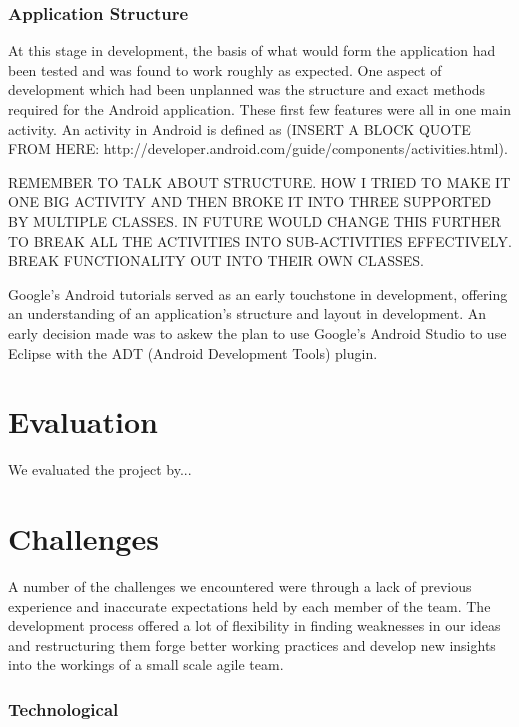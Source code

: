 \documentclass{l3proj}
\begin{document}
\subsection{Application Structure}
At this stage in development, the basis of what would form the application had been tested and was found to work roughly as expected. One aspect of development which had been unplanned was the structure and exact methods required for the Android application. These first few features were all in one main activity. An activity in Android is defined as (INSERT A BLOCK QUOTE FROM HERE:
http://developer.android.com/guide/components/activities.html).

REMEMBER TO TALK ABOUT STRUCTURE. HOW I TRIED TO MAKE IT ONE BIG ACTIVITY AND
THEN BROKE IT INTO THREE SUPPORTED BY MULTIPLE CLASSES. IN FUTURE WOULD CHANGE
THIS FURTHER TO BREAK ALL THE ACTIVITIES INTO SUB-ACTIVITIES EFFECTIVELY. BREAK
FUNCTIONALITY OUT INTO THEIR OWN CLASSES.

Google's Android tutorials served as an early touchstone in development,
offering an understanding of an application's structure and layout in
development. An early decision made was to askew the plan to use Google's
Android Studio to use Eclipse with the ADT (Android Development Tools) plugin.

\chapter{Evaluation}

We evaluated the project by...

\chapter{Challenges}
\label{Challenges}

A number of the challenges we encountered were through a lack of previous
experience and inaccurate expectations held by each member of the team. The
development process offered a lot of flexibility in finding weaknesses in our
ideas and restructuring them forge better working practices and develop new
insights into the workings of a small scale agile team.

\subsection{Technological}
\end{document}
